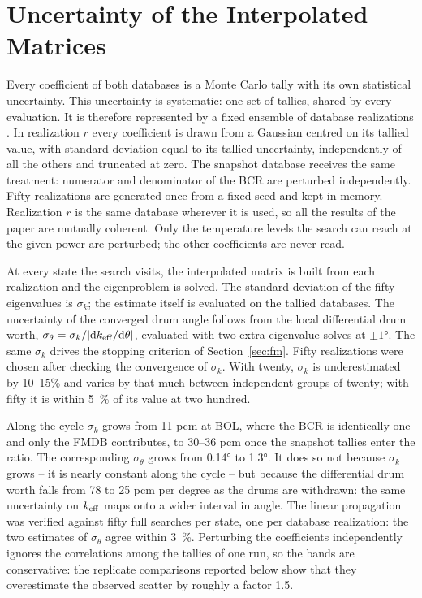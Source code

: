 \documentclass[]{ANStopical}
\begin{document}
\section{Uncertainty of the Interpolated Matrices}\label{sec:uq}

Every coefficient of both databases is a Monte Carlo tally with its own statistical uncertainty. This uncertainty is systematic: one set of tallies, shared by every evaluation. It is therefore represented by a fixed ensemble of database realizations \cite{vita2026fm}. In realization $r$ every coefficient is drawn from a Gaussian centred on its tallied value, with standard deviation equal to its tallied uncertainty, independently of all the others and truncated at zero. The snapshot database receives the same treatment: numerator and denominator of the BCR are perturbed independently. Fifty realizations are generated once from a fixed seed and kept in memory. Realization $r$ is the same database wherever it is used, so all the results of the paper are mutually coherent. Only the temperature levels the search can reach at the given power are perturbed; the other coefficients are never read.

At every state the search visits, the interpolated matrix is built from each realization and the eigenproblem is solved. The standard deviation of the fifty eigenvalues is $\sigma_k$; the estimate itself is evaluated on the tallied databases. The uncertainty of the converged drum angle follows from the local differential drum worth, $\sigma_\theta = \sigma_k / |{\rm d}k_{\rm eff}/{\rm d}\theta|$, evaluated with two extra eigenvalue solves at $\pm\ang{1}$. The same $\sigma_k$ drives the stopping criterion of Section~\ref{sec:fm}. Fifty realizations were chosen after checking the convergence of $\sigma_k$. With twenty, $\sigma_k$ is underestimated by 10--15\% and varies by that much between independent groups of twenty; with fifty it is within \SI{5}{\percent} of its value at two hundred.

Along the cycle $\sigma_k$ grows from 11 pcm at BOL, where the BCR is identically one and only the FMDB contributes, to 30--36 pcm once the snapshot tallies enter the ratio. The corresponding $\sigma_\theta$ grows from \ang{0.14} to \ang{1.3}. It does so not because $\sigma_k$ grows -- it is nearly constant along the cycle -- but because the differential drum worth falls from 78 to 25 pcm per degree as the drums are withdrawn: the same uncertainty on $k_{\rm eff}$ maps onto a wider interval in angle. The linear propagation was verified against fifty full searches per state, one per database realization: the two estimates of $\sigma_\theta$ agree within \SI{3}{\percent}. Perturbing the coefficients independently ignores the correlations among the tallies of one run, so the bands are conservative: the replicate comparisons reported below show that they overestimate the observed scatter by roughly a factor 1.5.
\end{document}
